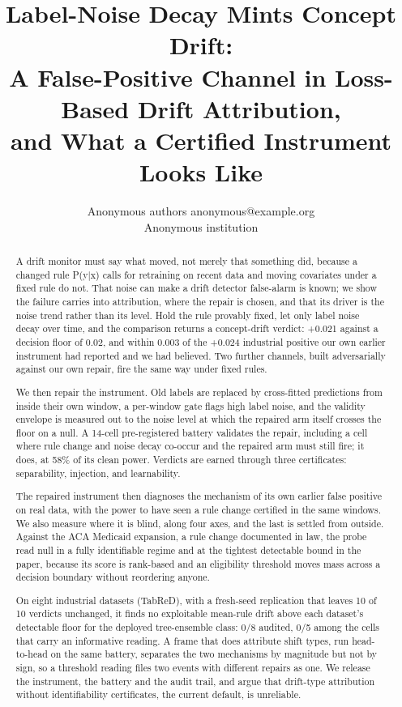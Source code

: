 \documentclass[10pt]{article} %
\title{Label-Noise Decay Mints Concept Drift:\\
A False-Positive Channel in Loss-Based Drift Attribution,\\
and What a Certified Instrument Looks Like}
\author{\name Anonymous authors \email anonymous@example.org\\
      \addr Anonymous institution}
\begin{document}
\maketitle

\begin{abstract}
A drift monitor must say what moved, not merely that something did, because a changed rule P(y|x)
calls for retraining on recent data and moving covariates under a fixed rule do not. That noise can make a drift detector
false-alarm is known; we show the failure carries into attribution, where the repair is chosen, and
that its driver is the noise trend rather than its level. Hold the rule provably fixed, let only label noise decay over time, and the comparison
returns a concept-drift verdict: +0.021 against a decision floor of 0.02, and within 0.003 of the
+0.024 industrial positive our own earlier instrument had reported and we had believed. Two further
channels, built adversarially against our own repair, fire the same way under fixed rules.

We then repair the instrument. Old labels are replaced by cross-fitted predictions from inside their
own window, a per-window gate flags high label noise, and the validity envelope is measured out to
the noise level at which the repaired arm itself crosses the floor on a null. A 14-cell
pre-registered battery validates the repair, including a cell where rule change and noise decay
co-occur and the repaired arm must still fire; it does, at 58\% of its clean power. Verdicts are
earned through three certificates: separability, injection, and learnability.

The repaired instrument then diagnoses the mechanism of its own earlier false positive on real
data, with the power to have seen a rule change certified in the same windows. We also measure where
it is blind, along four axes, and the last is settled from outside. Against the ACA Medicaid
expansion, a rule change documented in law, the probe read null in a fully identifiable regime and
at the tightest detectable bound in the paper, because its score is rank-based and an eligibility
threshold moves mass across a decision boundary without reordering anyone.

On eight industrial datasets (TabReD), with a fresh-seed replication that leaves 10 of 10 verdicts unchanged, it finds
no exploitable mean-rule drift above each dataset's detectable floor for the deployed tree-ensemble
class: 0/8 audited, 0/5 among the cells that carry an informative reading. A frame that does attribute shift types, run head-to-head on the same battery, separates
the two mechanisms by magnitude but not by sign, so a threshold reading files two events with
different repairs as one. We release the instrument, the battery and the audit trail, and argue that
drift-type attribution without identifiability certificates, the current default, is unreliable.
\end{abstract}
\end{document}
